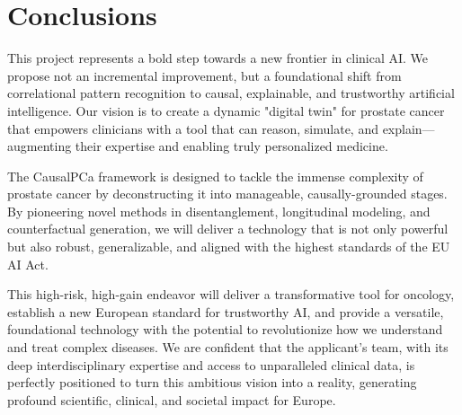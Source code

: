\documentclass[11pt, a4paper]{article}
\begin{document}
\section{Conclusions}
This project represents a bold step towards a new frontier in clinical AI. We propose not an incremental improvement, but a foundational shift from correlational pattern recognition to causal, explainable, and trustworthy artificial intelligence. Our vision is to create a dynamic "digital twin" for prostate cancer that empowers clinicians with a tool that can reason, simulate, and explain—augmenting their expertise and enabling truly personalized medicine.

The CausalPCa framework is designed to tackle the immense complexity of prostate cancer by deconstructing it into manageable, causally-grounded stages. By pioneering novel methods in disentanglement, longitudinal modeling, and counterfactual generation, we will deliver a technology that is not only powerful but also robust, generalizable, and aligned with the highest standards of the EU AI Act.

This high-risk, high-gain endeavor will deliver a transformative tool for oncology, establish a new European standard for trustworthy AI, and provide a versatile, foundational technology with the potential to revolutionize how we understand and treat complex diseases. We are confident that the applicant's team, with its deep interdisciplinary expertise and access to unparalleled clinical data, is perfectly positioned to turn this ambitious vision into a reality, generating profound scientific, clinical, and societal impact for Europe.




\printglossary[type=\acronymtype, title=List of Acronyms]
\end{document}
